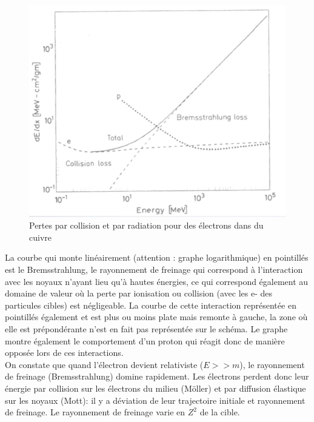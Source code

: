 \begin{figure}[ht]
    \centering
    \includegraphics[scale=0.40]{Images1/bremstrucmachin.png}
    \caption{Pertes par collision et par radiation pour des électrons dans du cuivre}
    \label{fig:pertes_collision}
\end{figure}

La courbe qui monte linéairement (attention : graphe logarithmique) en pointillés est le Bremsstrahlung, le rayonnement de freinage qui correspond à l'interaction avec les noyaux n'ayant lieu qu'à hautes énergies, ce qui correspond également au domaine de valeur où la perte par ionisation ou collision (avec les e- des particules cibles) est négligeable. La courbe de cette interaction représentée en pointillés également et est plus ou moins plate mais remonte à gauche, la zone où elle est prépondérante n'est en fait pas représentée sur le schéma. Le graphe montre également le comportement d'un proton qui réagit donc de manière opposée lors de ces interactions.\\
On constate que quand l'électron devient relativiste ($E>>m$), le rayonnement de freinage (Bremsstrahlung) domine rapidement. Les électrons perdent donc leur énergie par collision sur les électrons du milieu (Möller) et par diffusion élastique sur les noyaux (Mott): il y a déviation de leur trajectoire initiale et rayonnement de freinage. Le rayonnement de freinage varie en $Z^2$ de la cible.


